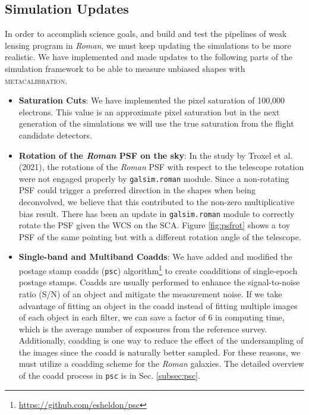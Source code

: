 \documentclass[fleqn,usenatbib]{mnras}
\begin{document}
\subsection{Simulation Updates}
In order to accomplish science goals, and build and test the pipelines of weak lensing program in \emph{Roman}, we must keep updating the simulations to be more realistic. We have implemented and made updates to the following parts of the simulation framework to be able to measure unbiased shapes with \textsc{metacalibration}. 
\begin{itemize}
    \setlength\itemsep{1em}
    \item \textbf{Saturation Cuts}:
    We have implemented the pixel saturation of 100,000 electrons. This value is an approximate pixel saturation but in the next generation of the simulations we will use the true saturation from the flight candidate detectors. 
    
    \item \textbf{Rotation of the \emph{Roman} PSF on the sky}:
    In the study by Troxel et al. (2021), the rotations of the \emph{Roman} PSF with respect to the telescope rotation were not engaged properly by \texttt{galsim.roman} module. Since a non-rotating PSF could trigger a preferred direction in the shapes when being deconvolved, we believe that this contributed to the non-zero multiplicative bias result. There has been an update in \texttt{galsim.roman} module to correctly rotate the PSF given the WCS on the SCA. Figure \ref{fig:psfrot} shows a toy PSF of the same pointing but with a different rotation angle of the telescope. 
    
    \item \textbf{Single-band and Multiband Coadds}: 
    We have added and modified the postage stamp coadds (\texttt{psc}) algorithm\footnote{\url{https://github.com/esheldon/psc}} to create coadditions of single-epoch postage stamps. Coadds are usually performed to enhance the signal-to-noise ratio (S/N) of an object and mitigate the measurement noise. If we take advantage of fitting an object in the coadd instead of fitting multiple images of each object in each filter, we can save a factor of 6 in computing time, which is the average number of exposures from the reference survey. Additionally, coadding is one way to reduce the effect of the undersampling of the images since the coadd is naturally better sampled. For these reasons, we must utilize a coadding scheme for the \emph{Roman} galaxies. The detailed overview of the coadd process in \texttt{psc} is in Sec. \ref{subsec:psc}. 
    

\end{itemize}
\end{document}
